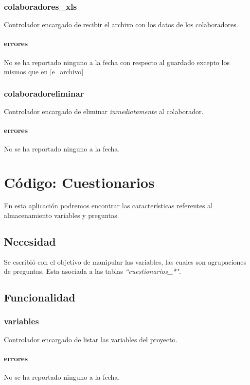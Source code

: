 \documentclass[10pt,a4paper]{book}
\begin{document}
	\subsection{colaboradores\_xls}
	Controlador encargado de recibir el archivo con los datos de los colaboradores.
	\subsubsection{errores}
	No se ha reportado ninguno a la fecha con respecto al guardado excepto los mismos que en \ref{e_archivo}

	\subsection{colaboradoreliminar}
	Controlador encargado de eliminar \textit{inmediatamente} al colaborador.
	\subsubsection{errores}
	No se ha reportado ninguno a la fecha.


	\chapter{Código: Cuestionarios}

	En esta aplicación podremos encontrar las características referentes al almacenamiento variables y preguntas.

	\section{Necesidad}
	
	Se escribió con el objetivo de manipular las variables, las cuales son agrupaciones de preguntas. Esta asociada a las tablas  \textit{``cuestionarios\_*"}.

	\section{Funcionalidad}

	\subsection{variables}
	Controlador encargado de listar las variables del proyecto.
	\subsubsection{errores}
	No se ha reportado ninguno a la fecha.
\end{document}
